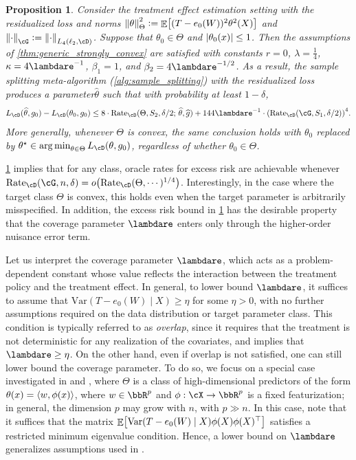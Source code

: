 \documentclass[11pt]{article} %
\newcommand{\pref}[1]{\cref{#1}}
\theoremstyle{theorem}  %
\newtheorem{proposition}{Proposition}
\theoremstyle{plain}
\DeclarePairedDelimiter{\abs}{\lvert}{\rvert} %
\DeclarePairedDelimiter{\brk}{[}{]}
\DeclarePairedDelimiter{\prn}{(}{)}
\DeclarePairedDelimiter{\nrm}{\|}{\|}
\DeclarePairedDelimiter{\tri}{\langle}{\rangle}
\DeclareMathOperator{\En}{\mathbb{E}}
\DeclareMathOperator*{\argmin}{arg\,min} %
\newcommand{\ldef}{\vcentcolon=}
\newcommand{\wh}[1]{\widehat{#1}}
\newcommand{\trn}{\top}
\renewcommand{\trn}{\dagger}
\newenvironment{revone}{\color{black}}{\ignorespacesafterend}
\newcommand{\littleo}{o}
\newcommand{\midsem}{;\,}
\newcommand{\poprisk}{L_{\cD}}
\newcommand{\var}{\mathrm{Var}}
\newcommand{\estone}{\wh{g}}
\newcommand{\esttwo}{\wh{\theta}}
\newcommand{\nuisance}{\cG}
\newcommand{\target}{\Theta}
\newcommand{\Rate}{\mathrm{Rate}_{\cD}}
\newcommand{\besttwo}{\theta^{\star}}
\newcommand{\gtone}{g_0}
\newcommand{\gttwo}{\theta_0}
\newcommand{\sampleone}{S_1}
\newcommand{\sampletwo}{S_2}
\renewcommand{\trn}{\top}
\newcommand{\param}{parameter\xspace}
\begin{document}
%
%
%
%
%
\begin{revone}
  \begin{proposition}
    \label{prop:treatment_example}
    Consider the treatment effect estimation setting with the residualized loss and norms $\nrm*{\theta}_{\target}^2\ldef\En\brk*{(T-e_0(W))^{2}\theta^2(X)}$ and $\nrm*{\cdot}_{\cG}\ldef\nrm*{\cdot}_{L_4(\ell_2,\cD)}$. Suppose that $\gttwo\in\target$ and $\abs{\gttwo(x)}\leq{}1$. Then the assumptions of \pref{thm:generic_strongly_convex} are satisfied with constants $r=0$, $\lambda = \frac{1}{4}$,  $\kappa=4\lambdare^{-1}$, $\beta_1=1$, and $\beta_2= 4\lambdare^{-1/2}$. As a result, the sample splitting meta-algorithm (\pref{alg:sample_splitting}) with the residualized loss produces a \param $\esttwo$ such that with probability at least $1-\delta$,
\begin{align*}
L_{\cD}(\esttwo,\gtone) - L_{\cD}(\gttwo, \gtone)
\leq{} 8\cdot{}\Rate(\target,\sampletwo,\delta/2\midsem{}\esttwo,\estone) +
144\lambdare^{-1}\cdot{}\prn*{
\Rate(\nuisance,\sampleone,\delta/2)
}^{4}.
\end{align*}
More generally, whenever $\Theta$ is convex, the same conclusion holds with $\gttwo$ replaced by $\besttwo\in\argmin_{\theta\in\target}\poprisk(\theta,\gtone)$, regardless of whether $\gttwo\in\target$.
\end{proposition}
\pref{prop:treatment_example} implies that for any class, oracle rates for excess risk are achievable whenever  $\Rate(\nuisance,n,\delta)=\littleo\prn*{\Rate(\target,\cdots)^{1/4}}$. Interestingly, in the case where the target class $\target$ is convex, this holds even when the target parameter is arbitrarily misspecified.  In addition, the excess risk bound in \pref{prop:treatment_example} has the desirable property that the coverage parameter $\lambdare$ enters only through the higher-order nuisance error term. 

Let us interpret the coverage parameter $\lambdare$, which acts as a problem-dependent constant whose value reflects the interaction between the treatment policy and the treatment effect. In general, to lower bound $\lambdare$, it suffices to assume that $\var(T-e_0(W) \mid X)\geq \eta$ for some $\eta> 0$, with no further assumptions required on the data distribution or target parameter class. This condition is typically referred to as \emph{overlap}, since it requires that the treatment is not deterministic for any realization of the covariates, and implies that $\lambdare\geq{}\eta$. On the other hand, even if overlap is not satisfied, one can still lower bound the coverage parameter. To do so, we focus on a special case investigated in \cite{chernozhukov2017orthogonal} and \cite{chernozhukov2018plugin}, where $\target$ is a class of high-dimensional predictors of the form $\theta(x) = \tri*{w,\phi(x)}$, where $w\in\bbR^{p}$ and $\phi:\cX\to\bbR^{p}$ is a fixed featurization; in general, the dimension $p$ may grow with $n$, with  $p\gg{}n$. In this case, note that it suffices that the matrix $\En\brk*{\mathrm{Var}(T-e_0(W)\mid X)\phi(X)\phi(X)^{\trn}}$ satisfies a restricted minimum eigenvalue condition. Hence, a lower bound on $\lambdare$ generalizes assumptions used in \cite{chernozhukov2017orthogonal,chernozhukov2018plugin}. 
%



\end{revone}
\end{document}
